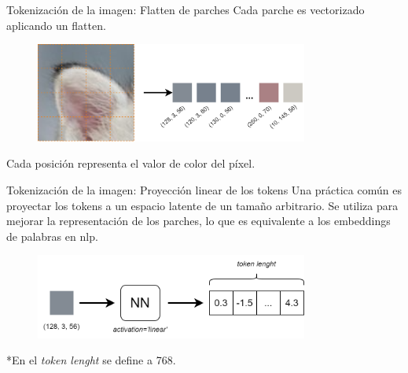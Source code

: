 \begin{frame}{Tokenización de la imagen: Flatten de parches}
Cada parche es \alert{vectorizado} aplicando un flatten.

\begin{figure}
    \centering
    \includegraphics[width=0.8\textwidth]{figures/Vision_Transformers/Patch_Flatten.png}
\end{figure}

Cada posición representa el valor de color del píxel.
\end{frame}

\begin{frame}{Tokenización de la imagen: Proyección linear de los tokens}
Una práctica común es proyectar los tokens a un espacio latente de un tamaño arbitrario. Se utiliza para mejorar la \alert{representación de los parches}, lo que es equivalente a los \alert{embeddings de palabras} en \gls{nlp}. 

\begin{figure}
    \centering
    \includegraphics[width=0.8\textwidth]{figures/Vision_Transformers/Token_Projection.png}
\end{figure}

*En \cite{dosovitskiy2020image} el \textit{token lenght} se define a 768.
\end{frame}

